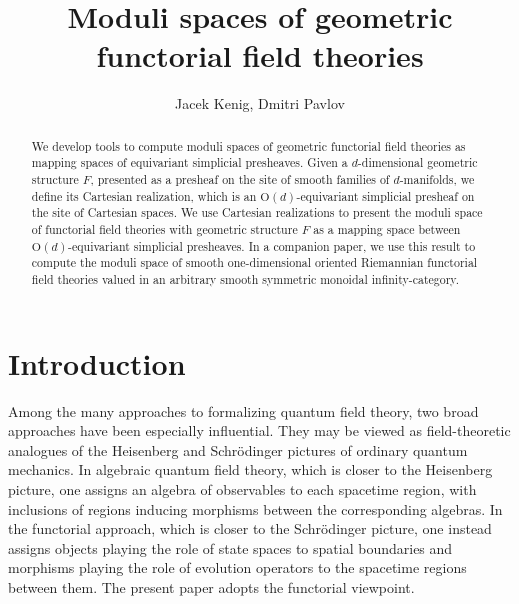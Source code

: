 \documentclass{amsart}
\author{Jacek Kenig, Dmitri Pavlov}
\title{Moduli spaces of geometric functorial field theories}
\theoremstyle{definition}
\numberwithin{equation}{subsection}
\numberwithin{subsubsection}{subsection}
\begin{document}
\raggedbottom

\begin{abstract}
  We develop tools to compute moduli spaces of geometric functorial field
  theories as mapping spaces of equivariant simplicial presheaves. Given a
  \(d\)-dimensional geometric structure \(F\), presented as a presheaf on the
  site of smooth families of \(d\)-manifolds, we define its Cartesian
  realization, which is an \(\mathrm{O}(d)\)-equivariant simplicial presheaf on
  the site of Cartesian spaces. We use Cartesian realizations to present the
  moduli space of functorial field theories with geometric structure \(F\) as a
  mapping space between \(\mathrm{O}(d)\)-equivariant simplicial presheaves. In
  a companion paper, we use this result to compute the moduli space of smooth
  one-dimensional oriented Riemannian functorial field theories valued in an
  arbitrary smooth symmetric monoidal infinity-category.
\end{abstract}

\maketitle

\tableofcontents

\section{Introduction}

Among the many approaches to formalizing quantum field theory, two broad
approaches have been especially influential. They may be viewed as
field-theoretic analogues of the Heisenberg and Schr\"{o}dinger pictures of
ordinary quantum mechanics. In algebraic quantum field theory, which is closer
to the Heisenberg picture, one assigns an algebra of observables to each
spacetime region, with inclusions of regions inducing morphisms between the
corresponding algebras. In the functorial approach, which is closer to the
Schr\"{o}dinger picture, one instead assigns objects playing the role of state
spaces to spatial boundaries and morphisms playing the role of evolution
operators to the spacetime regions between them. The present paper adopts the
functorial viewpoint.
\end{document}
